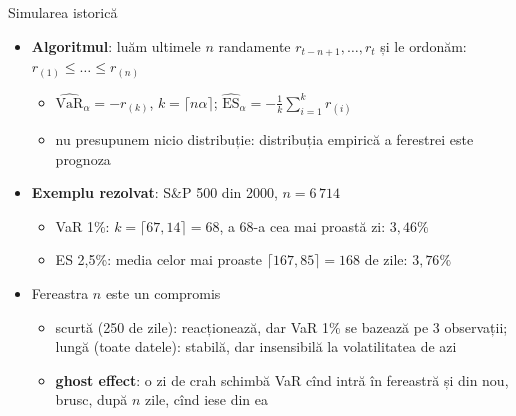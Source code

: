 \begin{frame}{Simularea istorică}
\itemsize{\footnotesize}
\begin{itemize}
    \item \textbf{Algoritmul}: luăm ultimele $n$ randamente $r_{t-n+1}, \dots, r_t$ și le ordonăm: $r_{(1)} \le \dots \le r_{(n)}$
    \begin{itemize}
        \item $\widehat{\mathrm{VaR}}_\alpha = -r_{(k)}$, $k = \lceil n\alpha \rceil$; \quad $\widehat{\mathrm{ES}}_\alpha = -\frac{1}{k}\sum_{i=1}^{k} r_{(i)}$
        \item nu presupunem nicio distribuție: distribuția empirică a ferestrei este prognoza
    \end{itemize}
    \item \textbf{Exemplu rezolvat}: S\&P 500 din 2000, $n = 6\,714$
    \begin{itemize}
        \item VaR 1\%: $k = \lceil 67{,}14 \rceil = 68$, a 68-a cea mai proastă zi: $3{,}46\%$
        \item ES 2,5\%: media celor mai proaste $\lceil 167{,}85 \rceil = 168$ de zile: $3{,}76\%$
    \end{itemize}
    \item Fereastra $n$ este un compromis
    \begin{itemize}
        \item scurtă (250 de zile): reacționează, dar VaR 1\% se bazează pe 3 observații; lungă (toate datele): stabilă, dar insensibilă la volatilitatea de azi
        \item \textbf{ghost effect}: o zi de crah schimbă VaR cînd intră în fereastră și din nou, brusc, după $n$ zile, cînd iese din ea
    \end{itemize}
\end{itemize}
\end{frame}

